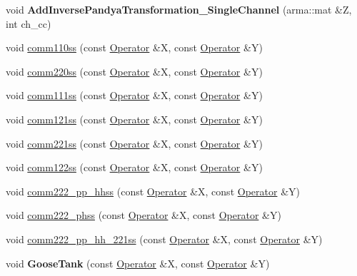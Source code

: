 \begin{DoxyCompactItemize}
\item 
void {\bfseries Add\+Inverse\+Pandya\+Transformation\+\_\+\+Single\+Channel} (arma\+::mat \&Z, int ch\+\_\+cc)\hypertarget{classOperator_a43d04939bd982e2a4323044dfe24023a}{}\label{classOperator_a43d04939bd982e2a4323044dfe24023a}

\item 
void \hyperlink{classOperator_a39adf2f2f225609606da088b59e3502a}{comm110ss} (const \hyperlink{classOperator}{Operator} \&X, const \hyperlink{classOperator}{Operator} \&Y)
\item 
void \hyperlink{classOperator_a8ea2254b8012c53ff6063a90ab7a5796}{comm220ss} (const \hyperlink{classOperator}{Operator} \&X, const \hyperlink{classOperator}{Operator} \&Y)
\item 
void \hyperlink{classOperator_ae22e28ebda5b170f2cdc4d2d9462971a}{comm111ss} (const \hyperlink{classOperator}{Operator} \&X, const \hyperlink{classOperator}{Operator} \&Y)
\item 
void \hyperlink{classOperator_af80e0152e9dffb0194b8b26c5d75d815}{comm121ss} (const \hyperlink{classOperator}{Operator} \&X, const \hyperlink{classOperator}{Operator} \&Y)
\item 
void \hyperlink{classOperator_abd2096925a9b0028ee988255955b907f}{comm221ss} (const \hyperlink{classOperator}{Operator} \&X, const \hyperlink{classOperator}{Operator} \&Y)
\item 
void \hyperlink{classOperator_a4f4738296848a6d504c331456f361736}{comm122ss} (const \hyperlink{classOperator}{Operator} \&X, const \hyperlink{classOperator}{Operator} \&Y)
\item 
void \hyperlink{classOperator_ae040aa05d6a84031c90ba2259cbb05ae}{comm222\+\_\+pp\+\_\+hhss} (const \hyperlink{classOperator}{Operator} \&X, const \hyperlink{classOperator}{Operator} \&Y)
\item 
void \hyperlink{classOperator_a25b768c4ddceead49af1c7f69d5071ea}{comm222\+\_\+phss} (const \hyperlink{classOperator}{Operator} \&X, const \hyperlink{classOperator}{Operator} \&Y)
\item 
void \hyperlink{classOperator_adf70943fb0ad3c36ea27c1c14dc7f6ec}{comm222\+\_\+pp\+\_\+hh\+\_\+221ss} (const \hyperlink{classOperator}{Operator} \&X, const \hyperlink{classOperator}{Operator} \&Y)
\item 
void {\bfseries Goose\+Tank} (const \hyperlink{classOperator}{Operator} \&X, const \hyperlink{classOperator}{Operator} \&Y)\hypertarget{classOperator_acc46445807541d5e060116884930d086}{}\label{classOperator_acc46445807541d5e060116884930d086}


\end{DoxyCompactItemize}
